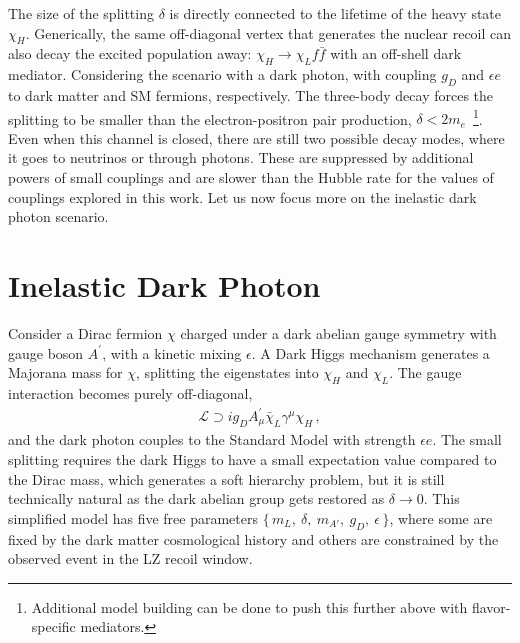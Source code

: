 \documentclass[prd,aps,reprint,superscriptaddress,nofootinbib]{revtex4-2}
\begin{document}
The size of the splitting $\delta$ is directly connected to the lifetime of the heavy state $\chi_H$. Generically, the same off-diagonal vertex that generates the nuclear recoil can also decay the excited population away: $\chi_H \rightarrow \chi_L f \bar{f}$ with an off-shell dark mediator. Considering the scenario with a dark photon, with coupling $g_D$ and $\epsilon e$ to dark matter and SM fermions, respectively. The three-body decay forces the splitting to be smaller than the electron-positron pair production, $\delta < 2m_e$~\footnote{Additional model building can be done to push this further above with flavor-specific mediators.}. Even when this channel is closed, there are still two possible decay modes, where it goes to neutrinos or through photons. These are suppressed by additional powers of small couplings and are slower than the Hubble rate for the values of couplings explored in this work. Let us now focus more on the inelastic dark photon scenario.



\section{Inelastic Dark Photon}


Consider a Dirac fermion $\chi$ charged under a dark abelian gauge symmetry with gauge boson $A^{'}$, with a kinetic mixing $\epsilon$. A Dark Higgs mechanism generates a Majorana mass for $\chi$, splitting the eigenstates into $\chi_H$ and $\chi_L$. The gauge interaction becomes purely off-diagonal,
\begin{align}
    \mathcal{L} \supset i g_D A_\mu^{'} \bar{\chi}_L \gamma^{\mu} \chi_H \, ,
\end{align}
and the dark photon couples to the Standard Model with strength $\epsilon e$. The small splitting requires the dark Higgs to have a small expectation value compared to the Dirac mass, which generates a soft hierarchy problem, but it is still technically natural as the dark abelian group gets restored as $\delta \rightarrow 0$. This simplified model has five free parameters $\{\, m_L,\ \delta,\ m_{A'},\ g_D,\ \epsilon \,\}$, where some are fixed by the dark matter cosmological history and others are constrained by the observed event in the LZ recoil window.
\end{document}

